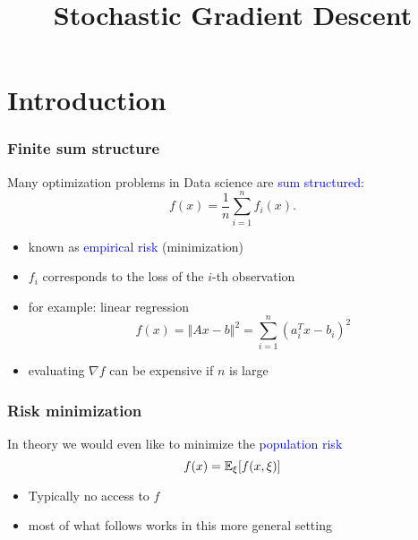 \documentclass{beamer}
\title{Stochastic Gradient Descent}
\begin{document}
\maketitle
{}

\section{Introduction}%
\label{sec:}

\begin{frame}
  \frametitle{Finite sum structure}

  Many optimization problems in Data science are \textcolor{blue}{sum structured}:
  \begin{equation}
    f(x) = \frac{1}{n} \sum_{i=1}^{n} f_i(x).
  \end{equation}

  \begin{itemize}
    \item known as \textcolor{blue}{empirical risk} (minimization)
    \item $f_i$ corresponds to the loss of the $i$-th observation
    \item for example: linear regression
          \begin{equation}
            f(x) = \Vert Ax-b \Vert^2 = \sum_{i=1}^{n} {(a_i^T x -b_i)}^2
          \end{equation}
    \item evaluating $\nabla f$ can be expensive if $n$ is large
  \end{itemize}
  
\end{frame}


\begin{frame}
  \frametitle{Risk minimization}
  In theory we would even like to minimize the \textcolor{blue}{population risk}
  \begin{equation}
    f(x) = \mathbb{E}_\xi [ f(x, \xi) ]
  \end{equation}
  \begin{itemize}
    \item Typically no access to $f$
    \item most of what follows works in this more general setting
  \end{itemize}
\end{frame}
\end{document}
